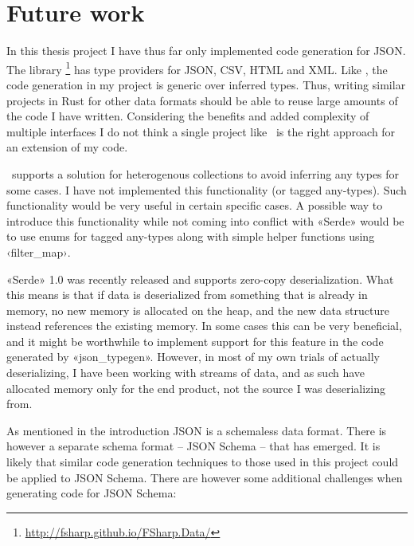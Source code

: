 
\chapter{Future work}

In this thesis project I have thus far only implemented code generation for JSON. The library \fsharpdata\footnote{\url{http://fsharp.github.io/FSharp.Data/}} has type providers for JSON, CSV, HTML and XML. Like \fsharpdata, the code generation in my project is generic over inferred types. Thus, writing similar projects in Rust for other data formats should be able to reuse large amounts of the code I have written. Considering the benefits and added complexity of multiple interfaces I do not think a single project like \fsharpdata\ is the right approach for an extension of my code.

\fsharpdata\ supports a solution for heterogenous collections to avoid inferring any types for some cases. I have not implemented this functionality (or tagged any-types). Such functionality would be very useful in certain specific cases. A possible way to introduce this functionality while not coming into conflict with «Serde» would be to use enums for tagged any-types along with simple helper functions using ‹filter_map›.

«Serde» 1.0 was recently released and supports zero-copy deserialization. What this means is that if data is deserialized from something that is already in memory, no new memory is allocated on the heap, and the new data structure instead references the existing memory. In some cases this can be very beneficial, and it might be worthwhile to implement support for this feature in the code generated by «json_typegen». However, in most of my own trials of actually deserializing, I have been working with streams of data, and as such have allocated memory only for the end product, not the source I was deserializing from.

As mentioned in the introduction JSON is a schemaless data format. There is however a separate schema format -- JSON Schema -- that has emerged. It is likely that similar code generation techniques to those used in this project could be applied to JSON Schema. There are however some additional challenges when generating code for JSON Schema:

